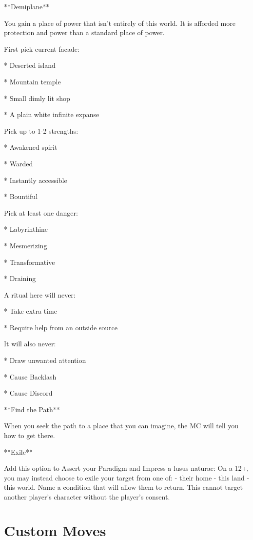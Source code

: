 \documentclass[
  oneside,
  statementpaper,
  9pt]{memoir}
\begin{document}
\begin{Player}

**Demiplane**

You gain a place of power that isn’t entirely of this world. It is afforded more protection and power than a standard place of power.

First pick current facade:

* Deserted island

* Mountain temple

* Small dimly lit shop

* A plain white infinite expanse

Pick up to 1-2 strengths:

* Awakened spirit

* Warded

* Instantly accessible

* Bountiful

Pick at least one danger:

* Labyrinthine

* Mesmerizing

* Transformative

* Draining

A ritual here will never:

* Take extra time

* Require help from an outside source

It will also never:

* Draw unwanted attention

* Cause Backlash

* Cause Discord

**Find the Path**

When you seek the path to a place that you can imagine, the MC will tell you how to get there.

**Exile**

Add this option to Assert your Paradigm and Impress a lusus naturae: On a 12+, you may instead choose to exile your target from one of: - their home - this land - this world. Name a condition that will allow them to return. This cannot target another player’s character without the player’s consent.

\end{Player}

\hypertarget{custom-moves}{%
\section{Custom Moves}\label{custom-moves}}
\end{document}

